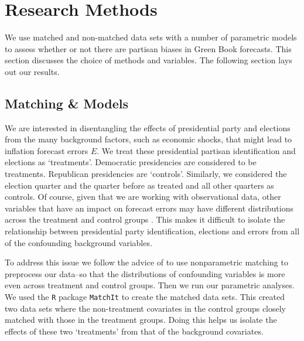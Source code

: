 \documentclass[a4paper]{article}\usepackage{graphicx, color}
\begin{document}

\section{Research Methods}

We use matched and non-matched data sets with a number of parametric models \citep[see][]{Ho2007} to assess whether or not there are partisan biases in Green Book forecasts. This section discusses the choice of methods and variables. The following section lays out our results.

\subsection{Matching \& Models}

We are interested in disentangling the effects of presidential party and elections from the many background factors, such as economic shocks, that might lead to inflation forecast errors $E$. We treat these presidential partisan identification and elections as `treatments'. Democratic presidencies are considered to be treatments. Republican presidencies are `controls'. Similarly, we considered the election quarter and the quarter before as treated and all other quarters as controls. Of course, given that we are working with observational data, other variables that have an impact on forecast errors may have different distributions across the treatment and control groups \citep{Diamond2012, Cochran1973}. This makes it difficult to isolate the relationship between presidential party identification, elections and errors from all of the confounding background variables.

To address this issue we follow the advice of \cite{Ho2007} to use nonparametric matching to preprocess our data--so that the distributions of confounding variables is more even across treatment and control groups. Then we run our parametric analyses. We used the {\tt{R}} package {\tt{MatchIt}} \citep{matchit2011} to create the matched data sets. This created two data sets where the non-treatment covariates in the control groups closely matched with those in the treatment groups. Doing this helps us isolate the effects of these two `treatments' from that of the background covariates. 
\end{document}
